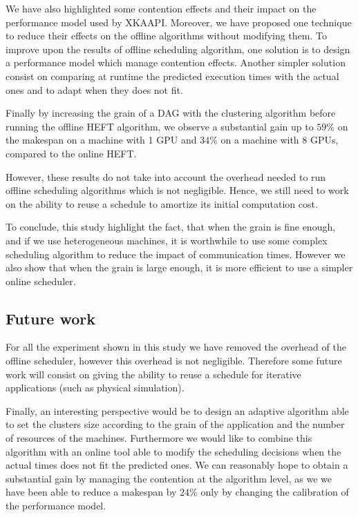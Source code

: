 \documentclass[10pt, conference, compsocconf,pdftex,dvipsnames]{IEEEtran}
\begin{document}
We have also highlighted some  contention effects and their impact on the
performance model used by XKAAPI. Moreover, we have proposed one technique to
reduce their effects on the offline algorithms without modifying them.  To
improve upon the results of offline scheduling algorithm, one solution is to
design a performance model which manage contention effects.  Another simpler
solution consist on comparing at runtime the predicted execution times with
the actual ones and to adapt when they does not fit.

Finally by increasing the grain of a DAG with the clustering algorithm before
running the offline HEFT algorithm, we observe a substantial gain up to $59\%$
on the makespan on a machine with 1 GPU and $34\%$ on a machine with 8 GPUs, 
compared to the online HEFT.

However, these results do not take into account the overhead needed to run
offline scheduling algorithms which is not negligible. Hence, we still need to
work on the ability to reuse a schedule to amortize its initial computation
cost. 

To conclude, this study highlight the fact, that when the grain is fine
enough, and if we use heterogeneous machines, it is worthwhile to use some 
complex scheduling algorithm to reduce the impact of communication times.
However we also show that when the grain is large enough, it is more
efficient to use a simpler online scheduler.

\subsection{Future work}
\label{chap:cncl-work}

For all the experiment shown in this study we have removed the overhead of the
offline scheduler, however this overhead is not negligible. Therefore some
future work will consist on giving the ability to reuse a schedule
for iterative applications (such as physical simulation).

Finally, an interesting perspective would be to design an adaptive algorithm
able to set the clusters size according to the grain of the application and
the number of resources of the machines. Furthermore we would like to combine
this algorithm with an online tool able to modify the scheduling decisions
when the actual times does not fit the predicted ones. We can reasonably hope
to obtain a substantial gain by managing the contention at the algorithm
level, as we we have been able to reduce a makespan by $24\%$ only by changing
the calibration of the performance model.
\end{document}
